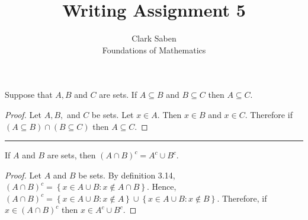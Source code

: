 \documentclass[12pt]{article}
\newenvironment{theorem}[2][Theorem]{\begin{trivlist}
\item[\hskip \labelsep {\bfseries #1}\hskip \labelsep {\bfseries #2.}]}{\end{trivlist}}
\begin{document}
 
 
\title{Writing Assignment 5}%
\author{Clark Saben\\ %
Foundations of Mathematics} %
 
\maketitle

 
\begin{theorem}{3.10}
	Suppose that $A, B$ and $C$ are sets. If $A \subseteq B$ and $B \subseteq C$ then $A \subseteq C$.
\end{theorem}
\begin{proof}
	Let $A, B,$ and $C$ be sets. Let $x \in A$. Then $x \in B$ and $x \in C$. Therefore 
	if $\left(A \subseteq B \right) \cap  \left(B \subseteq C \right)$ then $A \subseteq C$.
\end{proof}

\hrule
\begin{theorem}{3.21b}
	If $A$ and $B$ are sets, then $\left(A \cap B \right)^{c} = A^{c} \cup B^{c}$.
\end{theorem}
\begin{proof}
	Let $A$ and $B$ be sets.  By definition 3.14, $\left(A \cap B \right)^{c} = \left\{ x \in A \cup B : x \notin A \cap B \right\}$.
	Hence, $\left(A \cap B \right)^{c} = \left\{ x \in A \cup B : x \notin A \right\} \cup \left\{ x \in A \cup B : x \notin B \right\}$. Therefore,
	if $x \in \left(A \cap B \right)^{c}$ then $x \in A^{c} \cup B^{c}$.


\end{proof}

    



 
 
\end{document}
